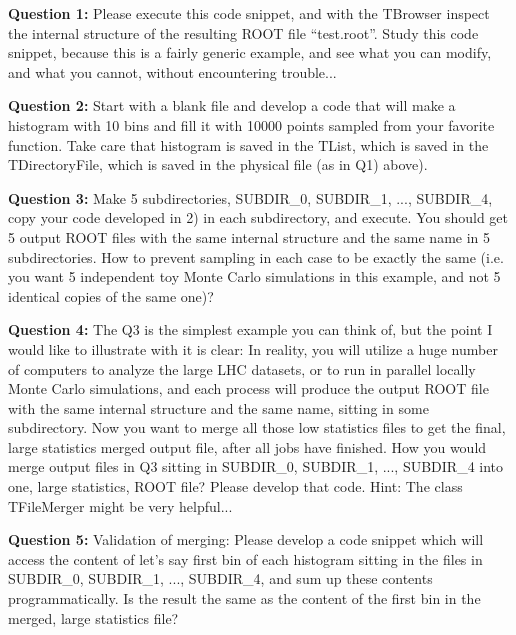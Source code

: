 \documentclass[11pt]{article}
\begin{document}
\noindent\textbf{Question 1:} Please execute this code snippet, and with the TBrowser inspect the internal structure of the resulting ROOT file ``test.root''. Study this code snippet, because this is a fairly generic example, and see what you can modify, and what you cannot, without encountering trouble...

\vspace{0.144cm}

\noindent\textbf{Question 2:} Start with a blank file and develop a code that will make a histogram with 10 bins and fill it with 10000 points sampled from your favorite function. Take care that histogram is saved in the TList, which is saved in the TDirectoryFile, which is saved in the physical file (as in Q1) above).

\vspace{0.144cm}

\noindent\textbf{Question 3:} Make 5 subdirectories, SUBDIR\_0,  SUBDIR\_1, ...,  SUBDIR\_4, copy your code developed in 2) in each subdirectory, and execute. You should get 5 output ROOT files with the same internal structure and the same name in 5 subdirectories. How to prevent sampling in each case to be exactly the same (i.e. you want 5 independent toy Monte Carlo simulations in this example, and not 5 identical copies of the same one)?

\vspace{0.144cm}

\noindent\textbf{Question 4:} The Q3 is the simplest example you can think of, but the point I would like to illustrate with it is clear: In reality, you will utilize a huge number of computers to analyze the large LHC datasets, or to run in parallel locally Monte Carlo simulations, and each process will produce the output ROOT file with the same internal structure and the same name, sitting in some subdirectory. Now you want to merge all those low statistics files to get the final, large statistics merged output file, after all jobs have finished. How you would merge output files in Q3 sitting in SUBDIR\_0, SUBDIR\_1, ...,  SUBDIR\_4 into one, large statistics, ROOT file? Please develop that code. Hint: The class TFileMerger might be very helpful...  

\vspace{0.144cm}

\noindent\textbf{Question 5:} Validation of merging: Please develop a code snippet which will access the content of let's say first bin of each histogram sitting in the files in SUBDIR\_0,  SUBDIR\_1, ...,  SUBDIR\_4, and sum up these contents programmatically. Is the result the same as the content of the first bin in the merged, large statistics file?
\end{document}
